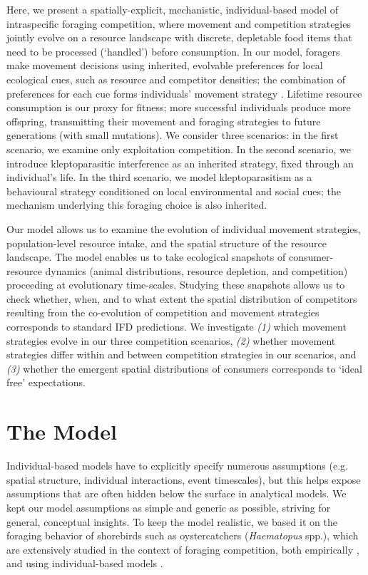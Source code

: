 \begin{refsection}[sorting=nyt]
Here, we present a spatially-explicit, mechanistic, individual-based model of intraspecific foraging competition, where movement and competition strategies jointly evolve on a resource landscape with discrete, depletable food items that need to be processed (`handled') before consumption.
In our model, foragers make movement decisions using inherited, evolvable preferences for local ecological cues, such as resource and competitor densities; the combination of preferences for each cue forms individuals' movement strategy \citep[similar to relative step-selection:][]{fortin2005, avgar2016}.
Lifetime resource consumption is our proxy for fitness; more successful individuals produce more offspring, transmitting their movement and foraging strategies to future generations (with small mutations).
We consider three scenarios: in the first scenario, we examine only exploitation competition.
In the second scenario, we introduce kleptoparasitic interference as an inherited strategy, fixed through an individual's life.
In the third scenario, we model kleptoparasitism as a behavioural strategy conditioned on local environmental and social cues; the mechanism underlying this foraging choice is also inherited.

Our model allows us to examine the evolution of individual movement strategies, population-level resource intake, and the spatial structure of the resource landscape.
The model enables us to take ecological snapshots of consumer-resource dynamics (animal distributions, resource depletion, and competition) proceeding at evolutionary time-scales.
Studying these snapshots allows us to check whether, when, and to what extent the spatial distribution of competitors resulting from the co-evolution of competition and movement strategies corresponds to standard IFD predictions.
We investigate \textit{(1)} which movement strategies evolve in our three competition scenarios, \textit{(2)} whether movement strategies differ within and between competition strategies in our scenarios, and \textit{(3)} whether the emergent spatial distributions of consumers corresponds to `ideal free' expectations.

\section*{The Model}

Individual-based models have to explicitly specify numerous assumptions (e.g. spatial structure, individual interactions, event timescales), but this helps expose assumptions that are often hidden below the surface in analytical models. 
We kept our model assumptions as simple and generic as possible, striving for general, conceptual insights.
To keep the model realistic, we based it on the foraging behavior of shorebirds such as oystercatchers (\textit{Haematopus} spp.), which are extensively studied in the context of foraging competition, both empirically \citep[e.g.][]{vahl2005, vahl2005a,vahl2007, rutten2010, rutten2010a}, and using individual-based models \citep[reviewed in][]{stillman2010}.


\end{refsection}
